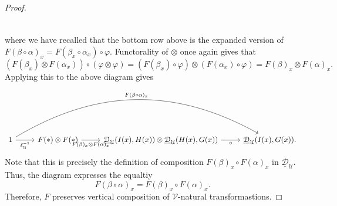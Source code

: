 \begin{proof}
\[\begin{tikzcd}[row sep = 2.5em, column sep = 2.5em]
	\end{tikzcd}\]
	where we have recalled that the bottom row above is the expanded version of $F(\beta\circ \alpha)_x=F(\beta_x\circ \alpha_x)\circ \varphi$. Functorality of $\otimes $ once again gives that
	\[
		(F(\beta_x)\otimes F(\alpha_x))\circ (\varphi\otimes \varphi)=(F(\beta_x)\circ \varphi)\otimes (F(\alpha_x)\circ \varphi)=F(\beta)_x\otimes F(\alpha)_x
	.\]
	Applying this to the above diagram gives
	\[\begin{tikzcd}[row sep = 2.5em, column sep = 2.5em]
		1\ar[" \ell _\mathcal{U} ^{-1}  "', r] \ar[" F(\beta\circ\alpha)_x ", bend left, rrr]  & F(*)\otimes F(*)\ar[" F(\beta)_x\otimes F(\alpha)_x "', r]  & \underline{\mathcal{D} } _\mathcal{U} (I(x),H(x))\otimes \underline{\mathcal{D} } _\mathcal{U} (H(x),G(x))\ar[" \circ  "', r] & \underline{\mathcal{D} } _\mathcal{U} (I(x),G(x)).
	\end{tikzcd}\]
	Note that this is precisely the definition of composition $F(\beta)_x\circ F(\alpha)_x$ in $\underline{\mathcal{D} } _\mathcal{U} $. Thus, the diagram expresses the equaltiy
	\[
		F(\beta\circ \alpha)_x=F(\beta)_x\circ F(\alpha)_x
	.\]
	Therefore, $F$ preserves vertical composition of $\mathcal{V} $-natural transformastions.


\end{proof}
